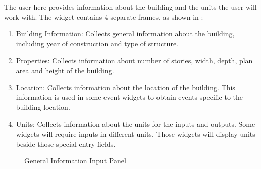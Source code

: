 The user here provides information about the building and the units
the user will work with. The widget contains 4 separate frames,
as shown in :

\begin{enumerate}
\item Building Information: Collects general information about the building, including year of construction and type of structure.
\item Properties: Collects information about number of stories, width, depth, plan area and height of the building.
\item Location: Collects information about the location of the building. This information is used in some event widgets to obtain events specific to the building location.
\item Units: Collects information about the units for the inputs and outputs. Some widgets will require inputs in different units. Those widgets will display units beside those special entry fields.
\end{enumerate}

\begin{figure}[!htbp]
  \caption{General Information Input Panel}
  \label{fig:gi_overview}
\end{figure}

